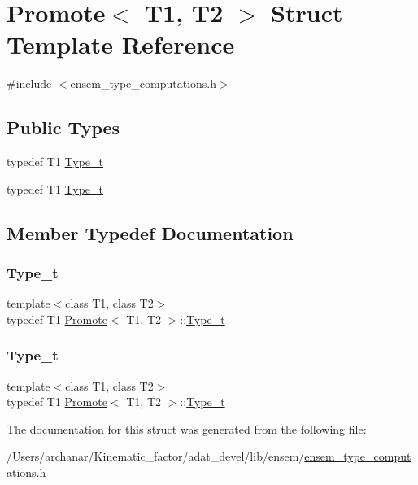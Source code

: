 \hypertarget{structPromote}{}\section{Promote$<$ T1, T2 $>$ Struct Template Reference}
\label{structPromote}


{\ttfamily \#include $<$ensem\+\_\+type\+\_\+computations.\+h$>$}

\subsection*{Public Types}
\begin{DoxyCompactItemize}
\item 
typedef T1 \mbox{\hyperlink{structPromote_a85c0d5fa03b60c087ac52aab76ccb930}{Type\+\_\+t}}
\item 
typedef T1 \mbox{\hyperlink{structPromote_a85c0d5fa03b60c087ac52aab76ccb930}{Type\+\_\+t}}
\end{DoxyCompactItemize}


\subsection{Member Typedef Documentation}
\mbox{\label{structPromote_a85c0d5fa03b60c087ac52aab76ccb930}} 
\subsubsection{\texorpdfstring{Type\_t}{Type\_t}\hspace{0.1cm}{\footnotesize\ttfamily [1/2]}}
{\footnotesize\ttfamily template$<$class T1, class T2$>$ \\
typedef T1 \mbox{\hyperlink{structPromote}{Promote}}$<$ T1, T2 $>$\+::\mbox{\hyperlink{structPromote_a85c0d5fa03b60c087ac52aab76ccb930}{Type\+\_\+t}}}

\mbox{\label{structPromote_a85c0d5fa03b60c087ac52aab76ccb930}} 
\subsubsection{\texorpdfstring{Type\_t}{Type\_t}\hspace{0.1cm}{\footnotesize\ttfamily [2/2]}}
{\footnotesize\ttfamily template$<$class T1, class T2$>$ \\
typedef T1 \mbox{\hyperlink{structPromote}{Promote}}$<$ T1, T2 $>$\+::\mbox{\hyperlink{structPromote_a85c0d5fa03b60c087ac52aab76ccb930}{Type\+\_\+t}}}



The documentation for this struct was generated from the following file\+:\begin{DoxyCompactItemize}
\item 
/\+Users/archanar/\+Kinematic\+\_\+factor/adat\+\_\+devel/lib/ensem/\mbox{\hyperlink{lib_2ensem_2ensem__type__computations_8h}{ensem\+\_\+type\+\_\+computations.\+h}}\end{DoxyCompactItemize}
